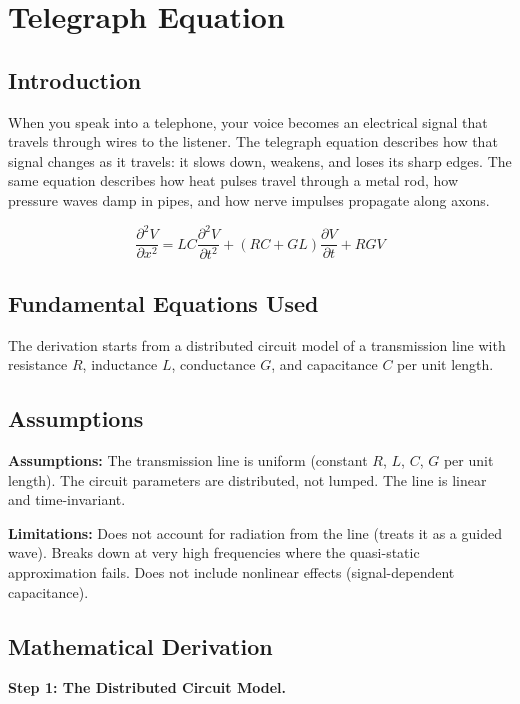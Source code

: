 \chapter{Telegraph Equation}

\section*{Introduction}

When you speak into a telephone, your voice becomes an electrical signal that travels through wires to the listener. The telegraph equation describes how that signal changes as it travels: it slows down, weakens, and loses its sharp edges. The same equation describes how heat pulses travel through a metal rod, how pressure waves damp in pipes, and how nerve impulses propagate along axons.



\[
\frac{\partial^2 V}{\partial x^2} = LC \frac{\partial^2 V}{\partial t^2} + (RC + GL)\frac{\partial V}{\partial t} + RGV
\]

\section*{Fundamental Equations Used}

The derivation starts from a distributed circuit model of a transmission line with resistance $R$, inductance $L$, conductance $G$, and capacitance $C$ per unit length.

\section*{Assumptions}

\textbf{Assumptions:} The transmission line is uniform (constant $R$, $L$, $C$, $G$ per unit length). The circuit parameters are distributed, not lumped. The line is linear and time-invariant.


\textbf{Limitations:} Does not account for radiation from the line (treats it as a guided wave). Breaks down at very high frequencies where the quasi-static approximation fails. Does not include nonlinear effects (signal-dependent capacitance).


\section*{Mathematical Derivation}

\textbf{Step 1: The Distributed Circuit Model.}

